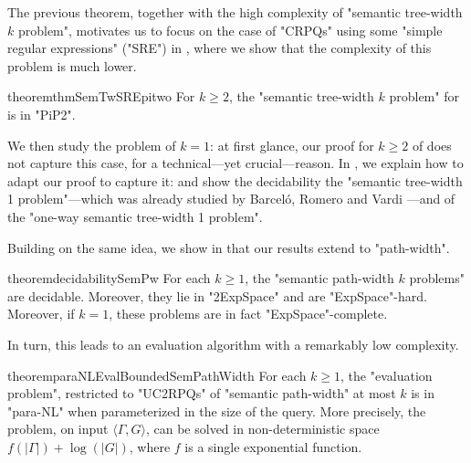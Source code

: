 
The previous theorem, together with the high complexity of "semantic tree-width $k$ problem",
motivates us to focus on the case of "CRPQs" using some "simple regular expressions" ("SRE") in , where we show that the complexity of this problem is much lower.

\begin{restatable*}{theorem}{thmSemTwSREpitwo}
    \AP\label{thm:semtw-sre-pitwo}
    For $k\geq 2$, the "semantic tree-width $k$ problem" for {\UCRPQSRE} is in "PiP2".
\end{restatable*}

We then study the problem of $k=1$: at first glance, our proof for $k\geq 2$ of
 does not capture this case, for a technical---yet crucial---reason. In
, we explain how to adapt our proof to capture it: 
and show the decidability the "semantic tree-width 1 problem"---which was already studied by 
Barceló, Romero and Vardi \cite{BarceloRomeroVardi2016SemanticAcyclicity}---and of the "one-way semantic tree-width 1 problem". 

Building on the same idea, we show in  that our results extend to "path-width".
\begin{restatable*}{theorem}{decidabilitySemPw}
    \AP\label{thm:decidability-sempw}
    For each $k \geq 1$,
    the "semantic path-width $k$ problems" are decidable. Moreover, they lie in "2ExpSpace"
    and are "ExpSpace"-hard. Moreover, if $k=1$, these problems are in fact "ExpSpace"-complete.
\end{restatable*}
In turn, this leads to an evaluation algorithm with a remarkably low complexity.
\begin{restatable*}{theorem}{paraNLEvalBoundedSemPathWidth}
	\AP\label{thm:evaluation-bounded-pathwidth}
	For each $k \geq 1$, the "evaluation problem", restricted to "UC2RPQs" of
	"semantic path-width" at most $k$ is in "para-NL" when parameterized in the size of the query.
	More precisely, the problem, on input $\langle \Gamma, G \rangle$, can be solved in
	non-deterministic space $f(|\Gamma|) + \log(|G|)$, where $f$ is a single exponential
	function.
\end{restatable*}

